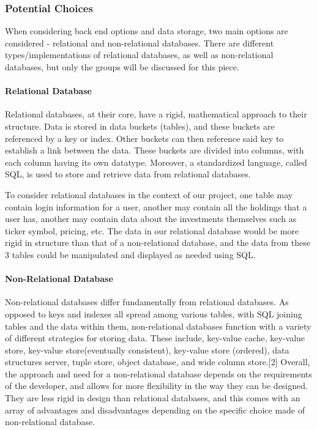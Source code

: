 \documentclass[onecolumn, draftclsnofoot,10pt, compsoc]{IEEEtran}
\begin{document}
\subsubsection{Potential Choices }
When considering back end options and data storage, two main options are considered - relational and non-relational databases. There are different types/implementations of relational databases, as well as non-relational databases, but only the groups will be discussed for this piece.

\paragraph{Relational Database}
Relational databases, at their core, have a rigid, mathematical approach to their structure. Data is stored in data buckets (tables), and these buckets are referenced by a key or index. Other buckets can then reference said key to establish a link between the data. These buckets are divided into columns, with each column having its own datatype. Moreover, a standardized language, called SQL, is used to store and retrieve data from relational databases. 

To consider relational databases in the context of our project, one table may contain login information for a user, another may contain all the holdings that a user has, another may contain data about the investments themselves such as ticker symbol, pricing, etc. The data in our relational database would be more rigid in structure than that of a non-relational database, and the data from these 3 tables could be manipulated and displayed as needed using SQL.

\paragraph{Non-Relational Database}
Non-relational databases differ fundamentally from relational databases. As opposed to keys and indexes all spread among various tables, with SQL joining tables and the data within them, non-relational databases function with a variety of different strategies for storing data. These include, key-value cache, key-value store, key-value store(eventually consistent), key-value store (ordered), data structures server, tuple store, object database, and wide column store.[2] Overall, the approach and need for a non-relational database depends on the requirements of the developer, and allows for more flexibility in the way they can be designed. They are less rigid in design than relational databases, and this comes with an array of advantages and disadvantages depending on the specific choice made of non-relational database.
\end{document}
